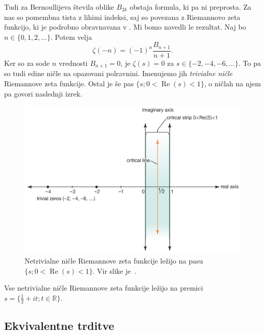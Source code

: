 \documentclass[mat1]{fmfdelo}
\DeclareMathOperator{\re}{Re}
\begin{document}
Tudi za Bernoullijeva števila oblike $B_{2k}$ obstaja formula, ki pa ni preprosta.
Za nas so pomembna tista z lihimi indeksi, saj so povezana z Riemannovo zeta funkcijo, ki je podrobno obravnavana v \cite[poglavje 1.5]{zetafunction}. Mi bomo navedli le rezultat. Naj bo $n\in\{0, 1, 2, \dots\}$. Potem velja
\begin{equation}
	\zeta(-n) = (-1)^n \frac{B_{n+1}}{n+1}.
\end{equation}
Ker so za sode $n$ vrednosti $B_{n+1}=0$, je $\zeta(s)=0$ za $s\in\{-2,-4,-6, \dots\}$. To pa so tudi edine ničle na opazovani polravnini. Imenujemo jih \emph{trivialne ničle} Riemannove zeta funkcije. Ostal je še pas $\{s; 0<\re(s)<1\}$, o ničlah na njem pa govori naslednji izrek. 

\begin{figure}[h!]
\begin{center}
\includegraphics[scale=0.33]{zeta_funkcija.png}
\caption{Netrivialne ničle Riemannove zeta funkcije ležijo na pasu $\{s; 0<\re(s)<1\}$. Vir slike je~\cite{britannica}.}
\end{center}
\end{figure}

\begin{izrek}
Vse netrivialne ničle Riemannove zeta funkcije ležijo na premici $s=\{\frac{1}{2}+it; t \in \mathbb{R} \}$.
\end{izrek}

\subsection{Ekvivalentne trditve}
\end{document}
